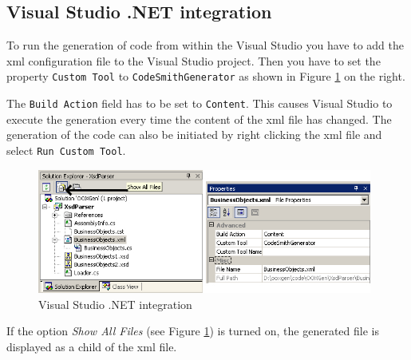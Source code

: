 \subsection{Visual Studio .NET integration}
To run the generation of code from within the Visual Studio you have to add the xml 
configuration file to the Visual Studio project. Then you have to set the 
property \verb~Custom Tool~ to \verb~CodeSmithGenerator~ as shown in Figure 
\ref{fig:codesmithVsdotnet} on the right.

The \verb~Build Action~ field has to be set to \verb~Content~. This causes Visual Studio 
to execute the generation every time the content of the xml file has changed. The generation 
of the code can also be initiated by right clicking the xml file and select 
\verb~Run Custom Tool~.

\begin{figure}[thb]
	\begin{center}
		\includegraphics[width=11cm]{./files/inc/figures/codesmithVsdotnet}
		\caption{\label{fig:codesmithVsdotnet}Visual Studio .NET integration}
	\end{center}
\end{figure}

If the option \emph{Show All Files} (see Figure \ref{fig:codesmithVsdotnet}) is 
turned on, the generated file is displayed as a child of the xml file.